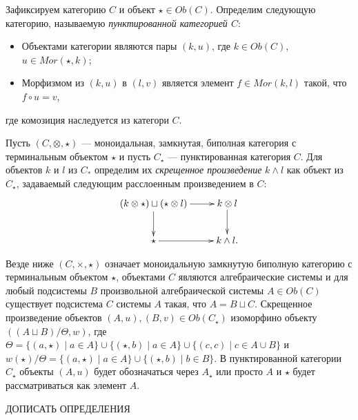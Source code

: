 \documentclass[a4paper,12pt]{article}
\begin{document}
Зафиксируем категорию $C$ и объект $\star \in Ob(C)$. Определим следующую категорию, называемую \textit{пунктированной категорией $C$}:
\begin{itemize}
    \item Объектами категории являются пары $(k,u)$, где $k \in Ob(C)$, $u \in Mor(\star,k)$;
    \item Морфизмом из $(k,u)$ в $(l,v)$ является элемент $f \in Mor(k,l)$ такой, что $f \circ u = v$,
\end{itemize}
где комозиция наследуется из категори $C$.

Пусть $(C,\otimes,\star)$ --- моноидальная, замкнутая, биполная категория с терминальным объектом $\star$ и пусть $C_\star$ --- пунктированная категория $C$. Для объектов $k$ и $l$ из $C_*$ определим их \textit{скрещенное произведение} $k \wedge l$ как объект из $C_\star$, задаваемый следующим расслоенным произведением в $C$:
$$\xymatrix{
    (k \otimes \star) \sqcup (\star \otimes l) \ar[r] \ar[d] & k \otimes l \ar[d]\\
    \star \ar[r] & k \wedge l.
}$$

Везде ниже $(C,\times,\star)$ означает моноидальную замкнутую биполную категорию с терминальным объектом $\star$, объектами $C$ являются алгебраические системы и для любый подсистемы $B$ произвольной алгебраической системы $A \in Ob(C)$ существует подсистема $C$ системы $A$ такая, что $A = B \sqcup C$. Скрещенное произведение объектов $(A,u), (B,v) \in Ob(C_\star)$ изоморфино объекту $((A \sqcup B)/\Theta, w)$, где $\Theta = \{(a,\star) \mid a \in A\} \cup \{(\star,b) \mid a \in A\} \cup \{(c,c) \mid c \in A \cup B\}$ и $w(\star)/\Theta = \{(a,\star) \mid a \in A\} \cup \{(\star,b) \mid b \in B\}$. В пунктированной категории $C_\star$ объекты $(A,u)$ будет обозначаться через $A_\star$ или просто $A$ и $\star$ будет рассматриваться как элемент $A$.

ДОПИСАТЬ ОПРЕДЕЛЕНИЯ
\end{document}

